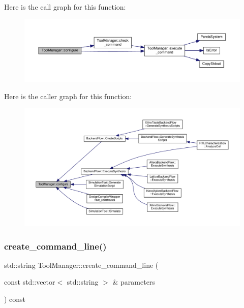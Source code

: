 Here is the call graph for this function\+:
\nopagebreak
\begin{figure}[H]
\begin{center}
\leavevmode
\includegraphics[width=350pt]{dc/dc5/classToolManager_abc49a9ba19dbcea87407517f7f746d1d_cgraph}
\end{center}
\end{figure}
Here is the caller graph for this function\+:
\nopagebreak
\begin{figure}[H]
\begin{center}
\leavevmode
\includegraphics[width=350pt]{dc/dc5/classToolManager_abc49a9ba19dbcea87407517f7f746d1d_icgraph}
\end{center}
\end{figure}
\mbox{\label{classToolManager_aafcbbb6648d720ac19b5201626f1315a}} 
\subsubsection{\texorpdfstring{create\+\_\+command\+\_\+line()}{create\_command\_line()}}
{\footnotesize\ttfamily std\+::string Tool\+Manager\+::create\+\_\+command\+\_\+line (\begin{DoxyParamCaption}\item[{const std\+::vector$<$ std\+::string $>$ \&}]{parameters }\end{DoxyParamCaption}) const\hspace{0.3cm}{\ttfamily [protected]}}



